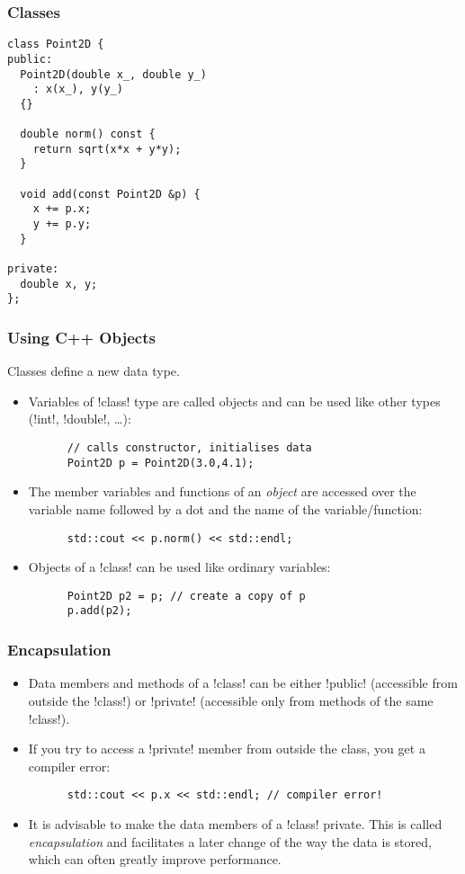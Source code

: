 \begin{frame}[fragile]
  \frametitle{Classes}
  \begin{lstlisting}
class Point2D {
public:
  Point2D(double x_, double y_)
    : x(x_), y(y_)
  {}

  double norm() const {
    return sqrt(x*x + y*y);
  }

  void add(const Point2D &p) {
    x += p.x;
    y += p.y;
  }

private:
  double x, y;
};
  \end{lstlisting}
\end{frame}

\begin{frame}[fragile]
  \frametitle{Using C++ Objects}
 Classes define a new data type. 
\begin{itemize}
  \item Variables of \inline!class! type are called objects and can be used like other types (\inline!int!, \inline!double!, \dots):
    \begin{lstlisting}
      // calls constructor, initialises data
      Point2D p = Point2D(3.0,4.1); 
    \end{lstlisting}
  \item The member variables and functions of an \emph{object} are accessed over the variable name followed by a dot and the name of the variable/function:
    \begin{lstlisting}
      std::cout << p.norm() << std::endl;
    \end{lstlisting}
  \item Objects of a \inline!class! can be used like ordinary variables:
    \begin{lstlisting}
      Point2D p2 = p; // create a copy of p
      p.add(p2);
    \end{lstlisting}
  \end{itemize}
\end{frame}

\begin{frame}[fragile]
  \frametitle{Encapsulation}
  \begin{itemize}
  \item Data members and methods of a \inline!class! can be either \inline!public! (accessible from outside the \inline!class!) or \inline!private! (accessible only from methods of the same \inline!class!).
  \item If you try to access a \inline!private! member from outside the class, you get a compiler error:
    \begin{lstlisting}
      std::cout << p.x << std::endl; // compiler error!
    \end{lstlisting}
  \item It is advisable to make the data members of a \inline!class! private. This is called \emph{encapsulation} and facilitates a later change of the way the data is stored, which can often greatly improve performance. 
  \end{itemize}
\end{frame}

